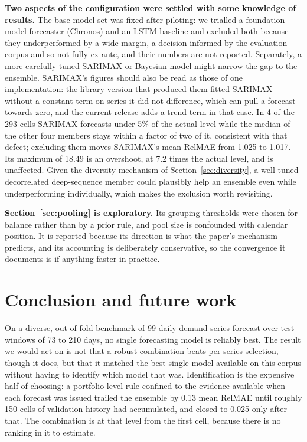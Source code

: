 \documentclass[11pt]{article}
\begin{document}
\textbf{Two aspects of the configuration were settled with some knowledge of results.} The base-model set was fixed after piloting: we trialled a foundation-model forecaster (Chronos) and an LSTM baseline and excluded both because they underperformed by a wide margin, a decision informed by the evaluation corpus and so not fully ex ante, and their numbers are not reported. Separately, a more carefully tuned SARIMAX or Bayesian model might narrow the gap to the ensemble. SARIMAX's figures should also be read as those of one implementation: the library version that produced them fitted SARIMAX without a constant term on series it did not difference, which can pull a forecast towards zero, and the current release adds a trend term in that case. In 4 of the 293 cells SARIMAX forecasts under 5\% of the actual level while the median of the other four members stays within a factor of two of it, consistent with that defect; excluding them moves SARIMAX's mean RelMAE from 1.025 to 1.017. Its maximum of 18.49 is an overshoot, at 7.2 times the actual level, and is unaffected. Given the diversity mechanism of Section~\ref{sec:diversity}, a well-tuned decorrelated deep-sequence member could plausibly help an ensemble even while underperforming individually, which makes the exclusion worth revisiting.

\textbf{Section~\ref{sec:pooling} is exploratory.} Its grouping thresholds were chosen for balance rather than by a prior rule, and pool size is confounded with calendar position. It is reported because its direction is what the paper's mechanism predicts, and its accounting is deliberately conservative, so the convergence it documents is if anything faster in practice.

\section{Conclusion and future work}
\label{sec:conclusion}

On a diverse, out-of-fold benchmark of 99 daily demand series forecast over test windows of 73 to 210 days, no single forecasting model is reliably best. The result we would act on is not that a robust combination beats per-series selection, though it does, but that it matched the best single model available on this corpus without having to identify which model that was. Identification is the expensive half of choosing: a portfolio-level rule confined to the evidence available when each forecast was issued trailed the ensemble by 0.13 mean RelMAE until roughly 150 cells of validation history had accumulated, and closed to 0.025 only after that. The combination is at that level from the first cell, because there is no ranking in it to estimate.
\end{document}
